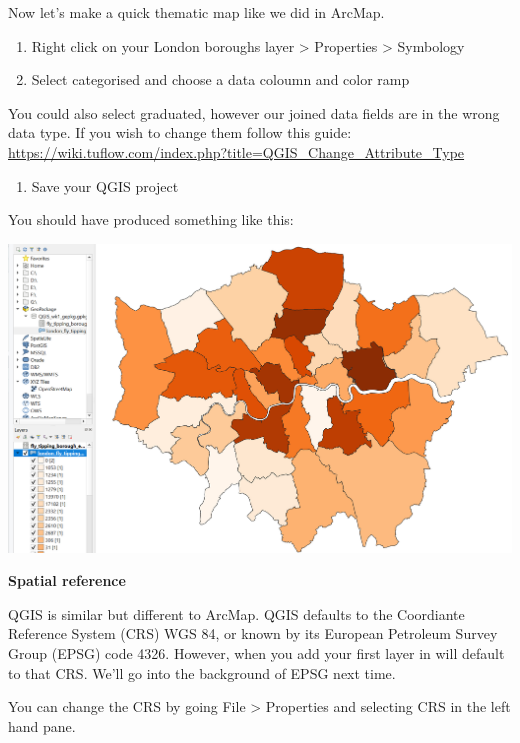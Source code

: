\documentclass[]{book}
\providecommand{\tightlist}{%
  \setlength{\itemsep}{0pt}\setlength{\parskip}{0pt}}
\begin{document}
Now let's make a quick thematic map like we did in ArcMap.

\begin{enumerate}
\def\labelenumi{\arabic{enumi}.}
\setcounter{enumi}{19}
\tightlist
\item
  Right click on your London boroughs layer \textgreater{} Properties \textgreater{} Symbology
\item
  Select categorised and choose a data coloumn and color ramp
\end{enumerate}

You could also select graduated, however our joined data fields are in the wrong data type. If you wish to change them follow this guide: \url{https://wiki.tuflow.com/index.php?title=QGIS_Change_Attribute_Type}

\begin{enumerate}
\def\labelenumi{\arabic{enumi}.}
\setcounter{enumi}{21}
\tightlist
\item
  Save your QGIS project
\end{enumerate}

You should have produced something like this:

\begin{center}\includegraphics[width=800pt]{prac1_images/QGIS_final} \end{center}

\textbf{Spatial reference}

QGIS is similar but different to ArcMap. QGIS defaults to the Coordiante Reference System (CRS) WGS 84, or known by its European Petroleum Survey Group (EPSG) code 4326. However, when you add your first layer in will default to that CRS. We'll go into the background of EPSG next time.

You can change the CRS by going File \textgreater{} Properties and selecting CRS in the left hand pane.
\end{document}
